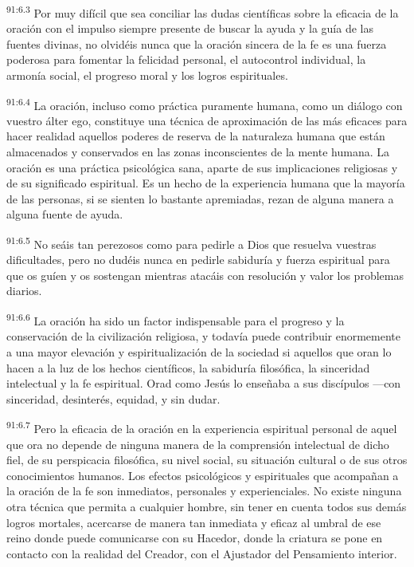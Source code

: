 \par
\textsuperscript{91:6.3} Por muy difícil que sea conciliar las dudas científicas sobre la eficacia de la oración con el impulso siempre presente de buscar la ayuda y la guía de las fuentes divinas, no olvidéis nunca que la oración sincera de la fe es una fuerza poderosa para fomentar la felicidad personal, el autocontrol individual, la armonía social, el progreso moral y los logros espirituales.

\par
\textsuperscript{91:6.4} La oración, incluso como práctica puramente humana, como un diálogo con vuestro álter ego, constituye una técnica de aproximación de las más eficaces para hacer realidad aquellos poderes de reserva de la naturaleza humana que están almacenados y conservados en las zonas inconscientes de la mente humana. La oración es una práctica psicológica sana, aparte de sus implicaciones religiosas y de su significado espiritual. Es un hecho de la experiencia humana que la mayoría de las personas, si se sienten lo bastante apremiadas, rezan de alguna manera a alguna fuente de ayuda.

\par
\textsuperscript{91:6.5} No seáis tan perezosos como para pedirle a Dios que resuelva vuestras dificultades, pero no dudéis nunca en pedirle sabiduría y fuerza espiritual para que os guíen y os sostengan mientras atacáis con resolución y valor los problemas diarios.

\par
\textsuperscript{91:6.6} La oración ha sido un factor indispensable para el progreso y la conservación de la civilización religiosa, y todavía puede contribuir enormemente a una mayor elevación y espiritualización de la sociedad si aquellos que oran lo hacen a la luz de los hechos científicos, la sabiduría filosófica, la sinceridad intelectual y la fe espiritual. Orad como Jesús lo enseñaba a sus discípulos ---con sinceridad, desinterés, equidad, y sin dudar.

\par
\textsuperscript{91:6.7} Pero la eficacia de la oración en la experiencia espiritual personal de aquel que ora no depende de ninguna manera de la comprensión intelectual de dicho fiel, de su perspicacia filosófica, su nivel social, su situación cultural o de sus otros conocimientos humanos. Los efectos psicológicos y espirituales que acompañan a la oración de la fe son inmediatos, personales y experienciales. No existe ninguna otra técnica que permita a cualquier hombre, sin tener en cuenta todos sus demás logros mortales, acercarse de manera tan inmediata y eficaz al umbral de ese reino donde puede comunicarse con su Hacedor, donde la criatura se pone en contacto con la realidad del Creador, con el Ajustador del Pensamiento interior.

